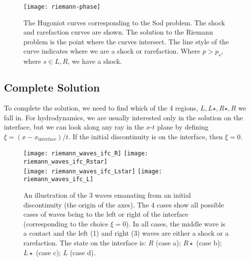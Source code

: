 \begin{figure}[t]
\centering
\texttt{[image: riemann-phase]}
\caption[The Hugoniot curves corresponding
to the Sod problem]{\label{fig:euler:riemann-curve} The Hugoniot
curves corresponding to the Sod problem.  The shock and rarefaction
curves are shown.  The solution to the Riemann problem is the point
where the curves intersect.  The line style of the curve indicates
where we are a shock or rarefaction.  Where $p > p_s$, where $s \in {L,R}$, we have a shock.\\
}
\end{figure}


\subsection{Complete Solution}

\label{Euler:riemann:solution}

To complete the solution, we need to find which of the 4 regions, $L,
L\star, R\star, R$ we fall in.  For hydrodynamics, we are usually
interested only in the solution on the interface, but we can look
along any ray in the $x$-$t$ plane by defining $\xi = (x -
x_\mathrm{interface})/t$.  If the initial discontinuity is on the
interface, then $\xi = 0$.

\begin{figure}
\centering
\texttt{[image: riemann\_waves\_ifc\_R]}
\texttt{[image: riemann\_waves\_ifc\_Rstar]} \\
\texttt{[image: riemann\_waves\_ifc\_Lstar]}
\texttt{[image: riemann\_waves\_ifc\_L]}
\caption[Wave configuration for the Riemann problem]
        {\label{fig:euler:riemann_sample} An illustration of the 3
          waves emanating from an initial discontinuity (the origin of
          the axes).  The 4 cases show all possible cases of waves
          being to the left or right of the interface (corresponding
          to the choice $\xi = 0$).  In all cases, the middle wave is
          a contact and the left (1) and right (3) waves are either a
          shock or a rarefaction.  The state on the interface is: $R$
          (case a); $R\star$ (case b); $L\star$ (case c); $L$ (case
          d).}
\end{figure}

